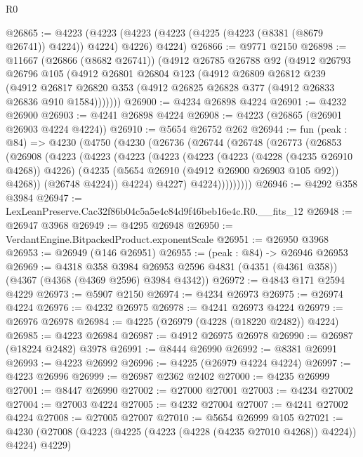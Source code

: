 \begin{lexlean}{R0}
\begin{coremodule}
@26865 := @4223
    (@4223 (@4223 (@4223 (@4225 (@4223 (@8381 (@8679 @26741)) @4224)) @4224) @4226) @4224)
@26866 := @9771 @2150
@26898 := @11667
    (@26866 (@8682 @26741))
    (@4912
      @26785
      @26788
      @92
      (@4912
        @26793
        @26796
        @105
        (@4912
          @26801
          @26804
          @123
          (@4912
            @26809
            @26812
            @239
            (@4912
              @26817
              @26820
              @353
              (@4912 @26825 @26828 @377 (@4912 @26833 @26836 @910 @1584)))))))
@26900 := @4234 @26898 @4224
@26901 := @4232 @26900
@26903 := @4241 @26898 @4224
@26908 := @4223 (@26865 (@26901 @26903 @4224 @4224))
@26910 := @5654 @26752 @262
@26944 := fun (peak : @84) =>
  @4230
    (@4750
      (@4230
        (@26736
          (@26744
            (@26748
              (@26773
                (@26853
                  (@26908
                    (@4223
                      (@4223
                        (@4223
                          (@4223
                            (@4223
                              (@4223 (@4228 (@4235 @26910 @4268)) @4226)
                              (@4235 (@5654 @26910 (@4912 @26900 @26903 @105 @92)) @4268))
                            (@26748 @4224))
                          @4224)
                        @4227)
                      @4224)))))))))
@26946 := @4292 @358 @3984
@26947 := LexLeanPreserve.Cac32f86b04c5a5e4c84d9f46beb16e4c.R0.__fits_12
@26948 := @26947 @3968
@26949 := @4295 @26948
@26950 := VerdantEngine.BitpackedProduct.exponentScale
@26951 := @26950 @3968
@26953 := @26949 (@146 @26951)
@26955 := (peak : @84) -> @26946 @26953
@26969 := @4318
    @358
    @3984
    @26953
    @2596
    @4831
    (@4351 (@4361 @358))
    (@4367 (@4368 (@4369 @2596) @3984 @4342))
@26972 := @4843 @171 @2594 @4229
@26973 := @5907 @2150
@26974 := @4234 @26973
@26975 := @26974 @4224
@26976 := @4232 @26975
@26978 := @4241 @26973 @4224
@26979 := @26976 @26978
@26984 := @4225 (@26979 (@4228 (@18220 @2482)) @4224)
@26985 := @4223 @26984
@26987 := @4912 @26975 @26978
@26990 := @26987 (@18224 @2482) @3978
@26991 := @8444 @26990
@26992 := @8381 @26991
@26993 := @4223 @26992
@26996 := @4225 (@26979 @4224 @4224)
@26997 := @4223 @26996
@26999 := @26987 @2362 @2402
@27000 := @4235 @26999
@27001 := @8447 @26990
@27002 := @27000 @27001
@27003 := @4234 @27002
@27004 := @27003 @4224
@27005 := @4232 @27004
@27007 := @4241 @27002 @4224
@27008 := @27005 @27007
@27010 := @5654 @26999 @105
@27021 := @4230 (@27008 (@4223 (@4225 (@4223 (@4228 (@4235 @27010 @4268)) @4224)) @4224) @4229)

\end{coremodule}
\end{lexlean}
